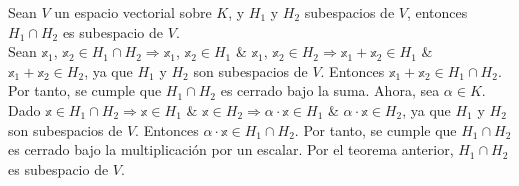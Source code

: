 \begin{theorem}
    Sean $V$ un espacio vectorial sobre $K$, y $H_1$ y $H_2$ subespacios de $V$, entonces $H_1 \cap H_2$ es subespacio de $V$. \\
    \demostracion Sean $\mathbb{x}_1$, $\mathbb{x}_2 \in H_1 \cap H_2 \Longrightarrow \mathbb{x}_1$, $\mathbb{x}_2 \in H_1$ \& $\mathbb{x}_1$, $\mathbb{x}_2 \in H_2 \Longrightarrow \mathbb{x}_1 + \mathbb{x}_2 \in H_1$ \& $\mathbb{x}_1 + \mathbb{x}_2 \in H_2$, ya que $H_1$ y $H_2$ son subespacios de $V$. Entonces $\mathbb{x}_1 + \mathbb{x}_2 \in H_1 \cap H_2$. Por tanto, se cumple que $H_1 \cap H_2$ es cerrado bajo la suma. Ahora, sea $\alpha \in K$. Dado $\mathbb{x} \in H_1 \cap H_2 \Longrightarrow \mathbb{x} \in H_1$ \& $\mathbb{x} \in H_2 \Longrightarrow \alpha \cdot \mathbb{x} \in H_1$ \& $\alpha \cdot \mathbb{x} \in H_2$, ya que $H_1$ y $H_2$ son subespacios de $V$. Entonces $\alpha \cdot \mathbb{x} \in H_1 \cap H_2$. Por tanto, se cumple que $H_1 \cap H_2$ es cerrado bajo la multiplicación por un escalar. Por el teorema anterior, $H_1 \cap H_2$ es subespacio de $V$.
\end{theorem}

